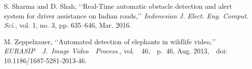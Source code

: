 \documentclass[14pt,a4paper,final]{extreport}
\begin{document}
\begin{thebibliography}{9}
{\fontsize{13pt}{8.4pt}\selectfont S. Sharma and D. Shah, ‘‘Real-Time automatic obstacle detection and alert system for driver assistance on Indian roads,’’ \textit{Indonesian J. Elect. Eng. Comput. Sci.}, vol. 1, no. 3, pp. 635–646, Mar. 2016.\par}\par

{\fontsize{13pt}{8.4pt}\selectfont M. Zeppelzauer, ‘‘Automated detection of elephants in wildlife video,’’ \textit{EURASIP\ \ J.\  Image  Video\ \  Process.}, vol.\ \ 46,\ \ p.\  46,  Aug.  2013,\ \  doi: 10.1186/1687-5281-2013-46.\par}\par
\end{thebibliography}
\end{document}
